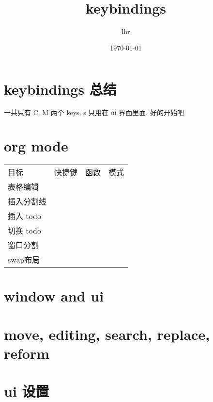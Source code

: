 \documentclass[11pt]{article}
\title{keybindings}
\author{lhr}
\date{\today}
\begin{document}
\maketitle

\setcounter{tocdepth}{3}
\tableofcontents
\vspace*{1cm}
\section{keybindings 总结}
\label{sec-1}

一共只有 C, M 两个 keys, s 只用在 ui 界面里面. 
好的开始吧 
\section{org mode}
\label{sec-2}


\begin{center}
\begin{tabular}{llll}
 目标        &  快捷键  &  函数  &  模式  \\
 表格编辑    &          &        &        \\
 插入分割线  &          &        &        \\
\hline
 插入 todo   &          &        &        \\
 切换 todo   &          &        &        \\
\hline
 窗口分割    &          &        &        \\
 swap布局    &          &        &        \\
\end{tabular}
\end{center}



 
\section{window and ui}
\label{sec-3}
\section{move, editing, search, replace, reform}
\label{sec-4}
\section{ui 设置}
\label{sec-5}

  
\end{document}

